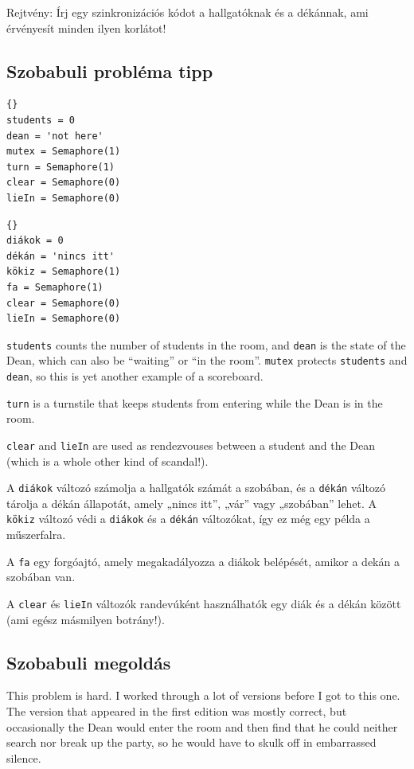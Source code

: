 \documentclass{book}
\newcommand{\clearemptydoublepage}{\newpage\cleardoublepage}
\begin{document}
Rejtvény: Írj egy szinkronizációs kódot a hallgatóknak és a dékánnak, ami érvényesít minden
ilyen korlátot!

\clearemptydoublepage
\subsection{Szobabuli probléma tipp}

\begin{lstlisting}[title={Szobabuli probléma tipp}]{}
students = 0                
dean = 'not here'           
mutex = Semaphore(1)
turn = Semaphore(1)
clear = Semaphore(0)
lieIn = Semaphore(0)
\end{lstlisting}

\begin{lstlisting}[title={Szobabuli probléma tipp}]{}
diákok = 0                
dékán = 'nincs itt'           
kökiz = Semaphore(1)
fa = Semaphore(1)
clear = Semaphore(0)
lieIn = Semaphore(0)
\end{lstlisting}

{\tt students} counts the number of students in the room,
and {\tt dean} is the state of the Dean, which can also be
``waiting'' or ``in the room''.
{\tt mutex} protects {\tt students} and {\tt dean}, so this
is yet another example of a scoreboard.

{\tt turn} is a turnstile that keeps students from entering
while the Dean is in the room.

{\tt clear} and {\tt lieIn} are used as rendezvouses between
a student and the Dean (which is a whole other kind of scandal!).

A {\tt diákok} változó számolja a hallgatók számát a szobában, és a {\tt dékán} változó tárolja a
dékán állapotát, amely „nincs itt”, „vár” vagy „szobában” lehet. A {\tt kökiz} változó védi
a {\tt diákok} és a {\tt dékán} változókat, így ez még egy példa a műszerfalra.

A {\tt fa} egy forgóajtó, amely megakadályozza a diákok belépését, amikor a dekán a
szobában van.

A {\tt clear} és {\tt lieIn} változók randevúként használhatók egy diák és a dékán között (ami egész
másmilyen botrány!).


\clearemptydoublepage
\subsection{Szobabuli megoldás}

This problem is hard.  I worked through a lot of versions before
I got to this one.  The version that appeared in the first edition
was mostly correct, but occasionally the Dean would enter the
room and then find that he could neither search nor break up the
party, so he would have to skulk off in embarrassed silence.
\end{document}
